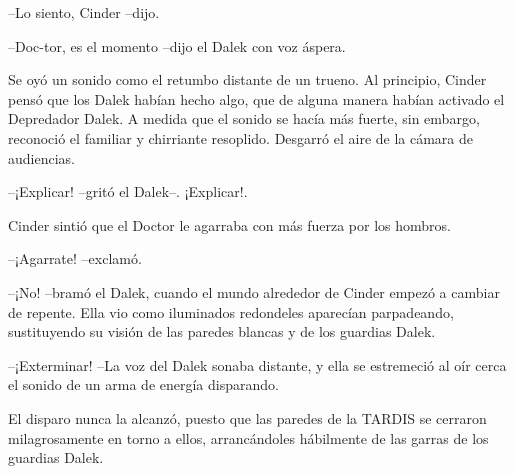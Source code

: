 --Lo siento, Cinder --dijo.

--Doc-tor, es el momento --dijo el Dalek con voz áspera.



Se oyó un sonido como el retumbo distante de un trueno. Al principio, Cinder pensó que los Dalek habían hecho algo, que de alguna manera habían activado el Depredador Dalek. A medida que el sonido se hacía más fuerte, sin embargo, reconoció el familiar y chirriante resoplido. Desgarró el aire de la cámara de audiencias.



--¡Explicar! --gritó el Dalek--. ¡Explicar!.



Cinder sintió que el Doctor le agarraba con más fuerza por los hombros. 



--¡Agarrate! --exclamó.

--¡No! --bramó el Dalek, cuando el mundo alrededor de Cinder empezó a cambiar de repente. Ella vio como iluminados redondeles aparecían parpadeando, sustituyendo su visión de las paredes blancas y de los guardias Dalek.

--¡Exterminar! --La voz del Dalek sonaba distante, y ella se estremeció al oír cerca el sonido de un arma de energía disparando.



El disparo nunca la alcanzó, puesto que las paredes de la TARDIS se cerraron milagrosamente en torno a ellos, arrancándoles hábilmente de las garras de los guardias Dalek.



